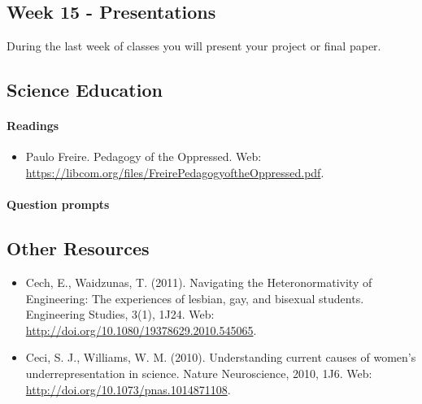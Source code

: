 \documentclass{article}
\begin{document}
\subsection{Week 15 - Presentations}
During the last week of classes you will present your project or final paper.


\subsection{Science Education}
\paragraph{Readings}
\begin{itemize}
\item Paulo Freire. Pedagogy of the Oppressed. Web: \url{https://libcom.org/files/FreirePedagogyoftheOppressed.pdf}.
\end{itemize}
\paragraph{Question prompts}


\subsection*{Other Resources}
\begin{itemize}
\item Cech, E., Waidzunas, T. (2011). Navigating the Heteronormativity of Engineering: The  experiences of lesbian, gay, and bisexual students. Engineering Studies, 3(1), 1J24. Web: \url{http://doi.org/10.1080/19378629.2010.545065}.
\item Ceci, S. J., Williams, W. M. (2010). Understanding current causes of women's  underrepresentation in science. Nature Neuroscience, 2010, 1J6. Web: \url{http://doi.org/10.1073/pnas.1014871108}.
\end{itemize}
\end{document}
